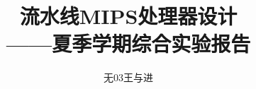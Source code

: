 \documentclass[a4paper]{article}
\begin{document}

\title{\textbf{流水线MIPS处理器设计}\\——夏季学期综合实验报告}
\author{无03\quad 王与进 }
\date{}
\maketitle

\tableofcontents

\newpage
\end{document}
